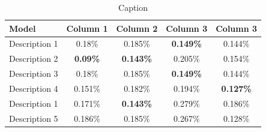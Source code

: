 \documentclass[runningheads,a4paper]{uwsese}
\begin{document}
\begin{table}[htbp]%
	\centering

	\begin{tabular}{| P{2.8cm} | c :  c : c : c |}
		\hline
		\textbf{Model}        &          \textbf{Column 1}          &          \textbf{Column 2}          &          \textbf{Column 3}          &        \textbf{Column 3}        \\
		\hline
		Description 1          &              0.18\%              &             0.185\%              &             \textbf{0.149\%}              &             0.144\%              \\
		\hdashline
		Description 2 &              \textbf{0.09\%}              &             \textbf{0.143\%}              &             0.205\%              &             0.154\%              \\
		\hdashline
		Description 3    &              0.18\%              &             0.185\%              &             \textbf{0.149\%}              &             0.144\%              \\
		\hdashline
		Description 4    &             0.151\%              &             0.182\%              &             0.194\%              &             \textbf{0.127\%}              \\
		\hdashline
		Description 1    &             0.171\%              &             \textbf{0.143\%}              &             0.279\%              &             0.186\%              \\
		\hline
		Description 5  &             0.186\%              &             0.185\%              &             0.267\%              &             0.128\%              \\
		\hline
	\end{tabular}
	\caption{Caption}
	\label{tab:example}
\end{table}
\end{document}

